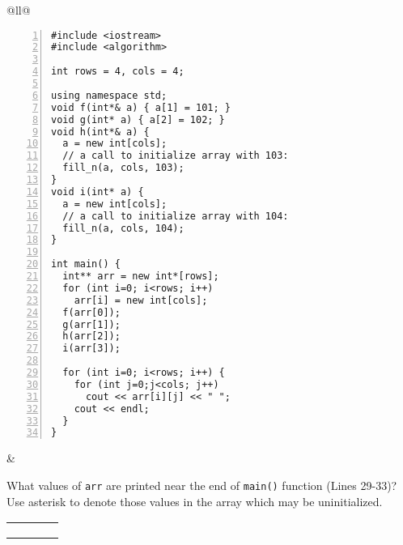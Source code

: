 \documentclass[11pt]{article}
\begin{document}
\begin{tabular}[t]{@{}ll@{}}  
\begin{minipage}[t]{0.48\columnwidth}
{\footnotesize
\begin{Verbatim}[frame=single,numbers=left]
#include <iostream>
#include <algorithm>

int rows = 4, cols = 4;

using namespace std;
void f(int*& a) { a[1] = 101; }
void g(int* a) { a[2] = 102; }
void h(int*& a) { 
  a = new int[cols];
  // a call to initialize array with 103:
  fill_n(a, cols, 103); 
}
void i(int* a) { 
  a = new int[cols]; 
  // a call to initialize array with 104:
  fill_n(a, cols, 104); 
}

int main() {
  int** arr = new int*[rows];
  for (int i=0; i<rows; i++) 
    arr[i] = new int[cols];
  f(arr[0]);  
  g(arr[1]);
  h(arr[2]);  
  i(arr[3]);
	
  for (int i=0; i<rows; i++) {
    for (int j=0;j<cols; j++)
      cout << arr[i][j] << " ";
    cout << endl;
  }
}
\end{Verbatim}
}
\end{minipage} &
\begin{minipage}[t]{0.50\columnwidth}

What values of {\tt arr} are printed 
near the end of {\tt main()} function (Lines 29-33)?\\
Use asterisk {\tt *} to denote those values in the array which may be uninitialized.

\vspace{10pt}
\begin{tabular}{|c|c|c|c|} \hline
 \hspace{1em} & \hspace{1em} & \hspace{1em} & \mbox{}\hspace{1em}\mbox{} \\[1.2ex] \hline
 \hspace{1em} & & & \\[1.2ex] \hline
 \hspace{1em} & & & \\[1.2ex] \hline
 \hspace{1em} & & & \\[1.2ex] \hline
\end{tabular}



\end{minipage}
\end{tabular}
\end{document}
